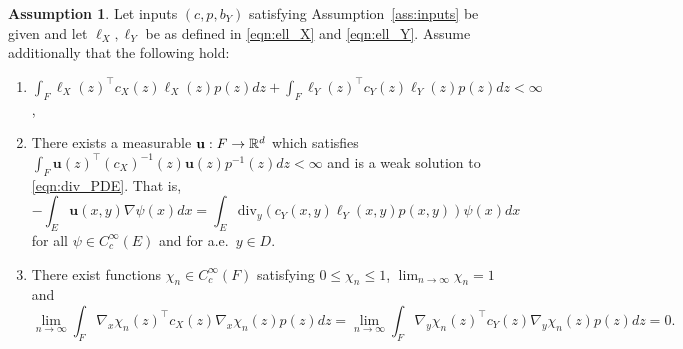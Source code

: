 \documentclass{article}
\theoremstyle{plain}
\theoremstyle{definition}
\newtheorem{assum}[lem]{Assumption}
\newcommand{\R}{\mathbb{R}}
\numberwithin{lem}{section}
\begin{document}
\begin{assum} \label{ass:conditions}
    Let inputs $(c,p,b_Y)$ satisfying Assumption~\ref{ass:inputs} be given and let $\ell_X,\ell_Y$ be as defined in \eqref{eqn:ell_X} and \eqref{eqn:ell_Y}. Assume additionally that the following hold:
    \begin{enumerate}
        \item $\int_F \ell_X(z)^\top c_X(z)\ell_X(z)p(z)dz + \int_F \ell_Y(z)^\top c_Y(z)\ell_Y(z)p(z)dz < \infty$, \label{item:finite_growth}
        \item There exists a measurable  ${\bf u}:F\to \R^d$ which satisfies $\int_F \mathbf{u}(z)^\top (c_X)^{-1}(z)\mathbf{u}(z)p^{-1}(z)dz < \infty$ and is a weak solution to \eqref{eqn:div_PDE}. That is,
        \[-\int_E \mathbf{u}(x,y)\nabla \psi(x)dx = \int_E \mathrm{div}_y(c_Y(x,y)\ell_Y(x,y)p(x,y))\psi(x)dx\]
     for all $\psi \in C_c^\infty(E)$ and for a.e.\ $y \in D$.
 \label{item:divergence} 
        \item \label{item:test_functions}
        There exist functions $\chi_n \in C_c^\infty(F)$ satisfying $0 \leq \chi_n \leq 1$, $\lim_{n \to \infty} \chi_n = 1$ and 
        \[\lim_{n \to \infty} \int_F \nabla_x\chi_n(z)^\top c_X(z)\nabla_x\chi_n(z)p(z)dz  = \lim_{n \to \infty} \int_F \nabla_y \chi_n(z)^\top c_Y(z)\nabla_y \chi_n(z)p(z)dz = 0. \] 
    \end{enumerate}
\end{assum}
\end{document}
